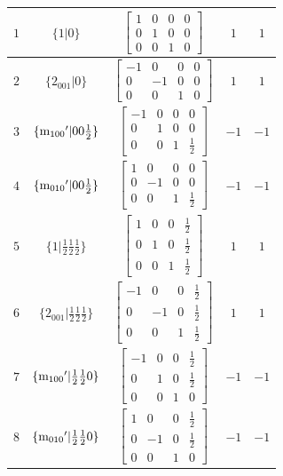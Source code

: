 \documentclass[fleqn,8pt]{jsarticle}
\begin{document}
\begin{longtable}{ccccc}
$ 1 $ & $ \{1|0\} $ & $ \begin{bmatrix} 1 & 0 & 0 & 0 \\ 0 & 1 & 0 & 0 \\ 0 & 0 & 1 & 0 \end{bmatrix} $ & $ 1 $ & $ 1 $ \\ \hline
$ 2 $ & $ \{2{}_{001}|0\} $ & $ \begin{bmatrix} -1 & 0 & 0 & 0 \\ 0 & -1 & 0 & 0 \\ 0 & 0 & 1 & 0 \end{bmatrix} $ & $ 1 $ & $ 1 $ \\ \hline
$ 3 $ & $ \{{\rm m}_{100}{}'|0 0 \frac{1}{2}\} $ & $ \begin{bmatrix} -1 & 0 & 0 & 0 \\ 0 & 1 & 0 & 0 \\ 0 & 0 & 1 & \frac{1}{2} \end{bmatrix} $ & $ -1 $ & $ -1 $ \\ \hline
$ 4 $ & $ \{{\rm m}_{010}{}'|0 0 \frac{1}{2}\} $ & $ \begin{bmatrix} 1 & 0 & 0 & 0 \\ 0 & -1 & 0 & 0 \\ 0 & 0 & 1 & \frac{1}{2} \end{bmatrix} $ & $ -1 $ & $ -1 $ \\ \hline
$ 5 $ & $ \{1|\frac{1}{2} \frac{1}{2} \frac{1}{2}\} $ & $ \begin{bmatrix} 1 & 0 & 0 & \frac{1}{2} \\ 0 & 1 & 0 & \frac{1}{2} \\ 0 & 0 & 1 & \frac{1}{2} \end{bmatrix} $ & $ 1 $ & $ 1 $ \\ \hline
$ 6 $ & $ \{2{}_{001}|\frac{1}{2} \frac{1}{2} \frac{1}{2}\} $ & $ \begin{bmatrix} -1 & 0 & 0 & \frac{1}{2} \\ 0 & -1 & 0 & \frac{1}{2} \\ 0 & 0 & 1 & \frac{1}{2} \end{bmatrix} $ & $ 1 $ & $ 1 $ \\ \hline
$ 7 $ & $ \{{\rm m}_{100}{}'|\frac{1}{2} \frac{1}{2} 0\} $ & $ \begin{bmatrix} -1 & 0 & 0 & \frac{1}{2} \\ 0 & 1 & 0 & \frac{1}{2} \\ 0 & 0 & 1 & 0 \end{bmatrix} $ & $ -1 $ & $ -1 $ \\ \hline
$ 8 $ & $ \{{\rm m}_{010}{}'|\frac{1}{2} \frac{1}{2} 0\} $ & $ \begin{bmatrix} 1 & 0 & 0 & \frac{1}{2} \\ 0 & -1 & 0 & \frac{1}{2} \\ 0 & 0 & 1 & 0 \end{bmatrix} $ & $ -1 $ & $ -1 $ \\
\end{longtable}
\end{document}
